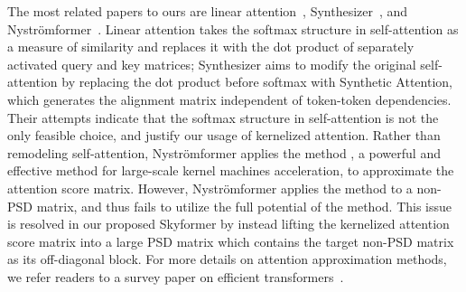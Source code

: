 The most related papers to ours are linear attention~\citep{katharopoulos2020transformers}, Synthesizer~\citep{DBLP:journals/corr/abs-2005-00743}, and Nystr\"omformer~\citep{DBLP:journals/corr/abs-2102-03902}.
Linear attention takes the softmax structure in self-attention as a measure of similarity and replaces it with the dot product of separately activated query and key matrices;
Synthesizer aims to modify the original self-attention by replacing the dot product before softmax with Synthetic Attention, which generates the alignment matrix independent of token-token dependencies.
Their attempts indicate that the softmax structure in self-attention is not the only feasible choice, and justify our usage of kernelized attention.
Rather than remodeling self-attention, Nystr\"omformer applies the \nystrom method \citep{williams2001using, drineas2005nystrom}, a powerful and effective method for large-scale kernel machines acceleration, to approximate the attention score matrix.
However, Nystr\"omformer applies the \nystrom method to a non-PSD matrix, and thus fails to utilize the full potential of the \nystrom method.
This issue is resolved in our proposed Skyformer by instead lifting the kernelized attention score matrix into a large PSD matrix which contains the target non-PSD matrix as its off-diagonal block.
For more details on attention approximation methods,
we refer readers to a survey paper on efficient transformers~\citep{DBLP:journals/corr/abs-2009-06732}.



\iffalse

\subsection{\nystrom Method for Empirical Kernel Matrix Approximation}



Previous studies have shown the efficiency of \nystrom method~\citep{} in empirical kernel matrix approximation, such as such as Recursive Sampling for the Nyström Method~\citep{DBLP:conf/nips/MuscoM17} and ---more---.



\fi